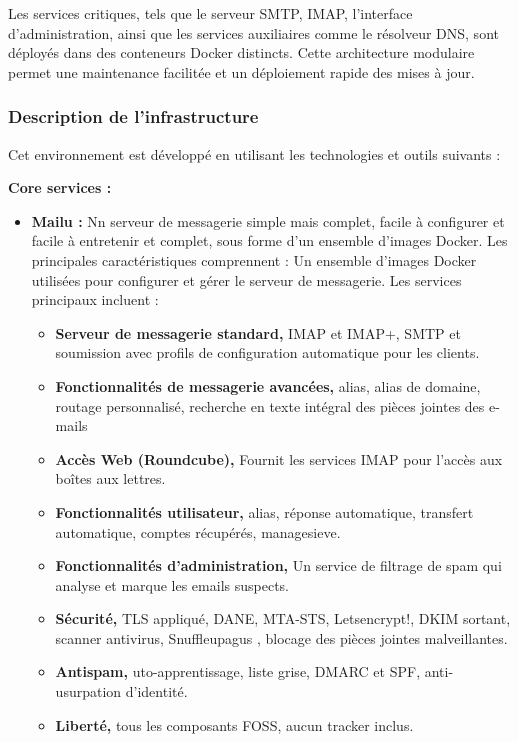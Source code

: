Les services critiques, tels que le serveur SMTP, IMAP, l'interface d'administration, ainsi que les services auxiliaires comme le résolveur DNS, sont déployés dans des conteneurs Docker distincts. Cette architecture modulaire permet une maintenance facilitée et un déploiement rapide des mises à jour.

\subsubsection{Description de l'infrastructure}

Cet environnement est développé en utilisant les technologies et outils suivants :

\noindent\textbf{Core services :}
\begin{itemize}
	\item \textbf{Mailu :} Nn serveur de messagerie simple mais complet, facile à configurer et facile à entretenir et complet, sous forme d'un ensemble d'images Docker. Les principales caractéristiques comprennent :
	      Un ensemble d'images Docker utilisées pour configurer et gérer le serveur de messagerie. Les services principaux incluent :
	      \begin{itemize}
		      \item \textbf{Serveur de messagerie standard,} IMAP et IMAP+, SMTP et soumission avec profils de configuration automatique pour les clients.
		      \item \textbf{Fonctionnalités de messagerie avancées,} alias, alias de domaine, routage personnalisé, recherche en texte intégral des pièces jointes des e-mails
		      \item \textbf{Accès Web (Roundcube),} Fournit les services IMAP pour l'accès aux boîtes aux lettres.
		      \item \textbf{Fonctionnalités utilisateur,} alias, réponse automatique, transfert automatique, comptes récupérés, managesieve.
		      \item \textbf{Fonctionnalités d'administration,} Un service de filtrage de spam qui analyse et marque les emails suspects.
		      \item \textbf{Sécurité,} TLS appliqué, DANE, MTA-STS, Letsencrypt!, DKIM sortant, scanner antivirus, Snuffleupagus , blocage des pièces jointes malveillantes.
		      \item \textbf{Antispam,} uto-apprentissage, liste grise, DMARC et SPF, anti-usurpation d'identité.
		      \item \textbf{Liberté,} tous les composants FOSS, aucun tracker inclus.
	      \end{itemize}
\end{itemize}

